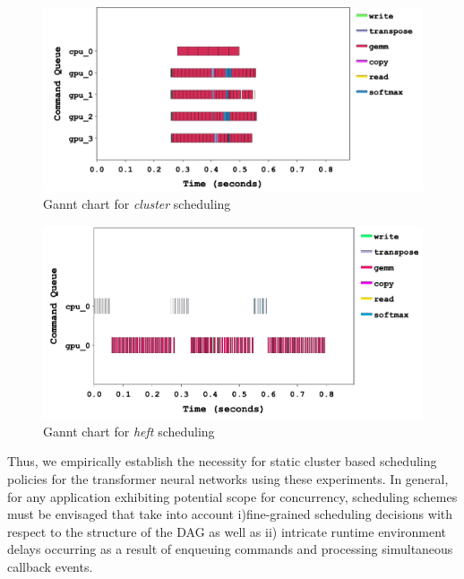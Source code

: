	\begin{figure}[ht]
		\centering
		\includegraphics[scale=0.40]{Pictures/best_gannt.png}
		\caption{\small Gannt chart for {\em cluster} scheduling  \label{fig:best_gannt}}
	\end{figure}
	\begin{figure}
		\centering
		\includegraphics[scale=0.40]{Pictures/dynamic_heft_gannt.png}
		\caption{\small Gannt chart for {\em heft} scheduling \label{fig:heft_gannt}}
	\end{figure}
	Thus, we empirically establish the necessity for static cluster based scheduling policies for the transformer neural networks using these experiments. In general, for any application exhibiting potential scope for concurrency, scheduling schemes must be envisaged that take into account i)fine-grained scheduling decisions with respect to the structure of the DAG as well as ii) intricate runtime environment delays occurring as a result of enqueuing commands and processing simultaneous callback events. 
